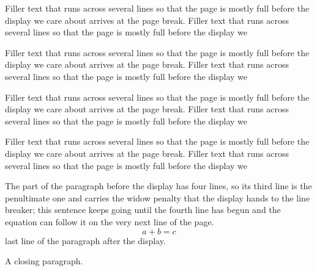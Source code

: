 \documentclass[10pt]{article}
\begin{document}
Filler text that runs across several lines so that the page is mostly full before the display we care about arrives at the page break. Filler text that runs across several lines so that the page is mostly full before the display we

Filler text that runs across several lines so that the page is mostly full before the display we care about arrives at the page break. Filler text that runs across several lines so that the page is mostly full before the display we

Filler text that runs across several lines so that the page is mostly full before the display we care about arrives at the page break. Filler text that runs across several lines so that the page is mostly full before the display we

Filler text that runs across several lines so that the page is mostly full before the display we care about arrives at the page break. Filler text that runs across several lines so that the page is mostly full before the display we

The part of the paragraph before the display has four lines, so its third line is the penultimate one and carries the widow penalty that the display hands to the line breaker; this sentence keeps going until the fourth line has begun and the equation can follow it on the very next line of the page.
\begin{equation} a + b = c \end{equation}
last line of the paragraph after the display.

A closing paragraph.
\end{document}
